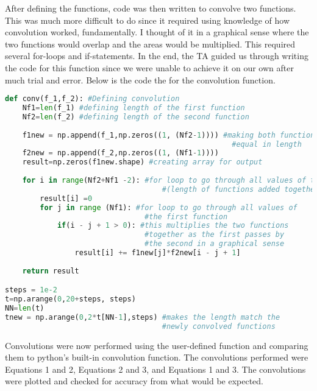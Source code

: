 \documentclass[12pt, titlepage]{article}
\begin{document}
        After defining the functions, code was then written to convolve two functions.  This was much more difficult to do since it required using knowledge of how convolution worked, fundamentally.  I thought of it in a graphical sense where the two functions would overlap and the areas would be multiplied.  This required several for-loops and if-statements.  In the end, the TA guided us through writing the code for this function since we were unable to achieve it on our own after much trial and error.  Below is the code the for the convolution function.
        \begin{lstlisting}[language=Python, caption=Part 1 Code]
def conv(f_1,f_2): #Defining convolution
    Nf1=len(f_1) #defining length of the first function
    Nf2=len(f_2) #defining length of the second function
    
    f1new = np.append(f_1,np.zeros((1, (Nf2-1)))) #making both functions 
                                                    #equal in length
    f2new = np.append(f_2,np.zeros((1, (Nf1-1))))
    result=np.zeros(f1new.shape) #creating array for output
    
    for i in range(Nf2+Nf1 -2): #for loop to go through all values of t 
                                    #(length of functions added together)
        result[i] =0
        for j in range (Nf1): #for loop to go through all values of 
                                #the first function
            if(i - j + 1 > 0): #this multiplies the two functions 
                                #together as the first passes by 
                                #the second in a graphical sense
                result[i] += f1new[j]*f2new[i - j + 1]
            
    return result

steps = 1e-2
t=np.arange(0,20+steps, steps)
NN=len(t)
tnew = np.arange(0,2*t[NN-1],steps) #makes the length match the 
                                    #newly convolved functions

        \end{lstlisting}
        
        Convolutions were now performed using the user-defined function and comparing them to python's built-in convolution function.  The convolutions performed were Equations 1 and 2, Equations 2 and 3, and Equations 1 and 3.  The convolutions were plotted and checked for accuracy from what would be expected.
        \clearpage
\end{document}
